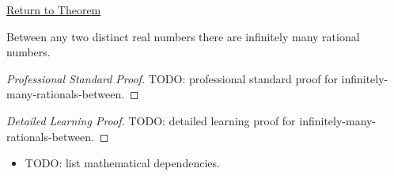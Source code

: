 \newpage
{}
\label{prf:infinitely-many-rationals-between}

\begin{remark*}[Return]
\hyperref[cor:infinitely-many-rationals-between]{Return to Theorem}
\end{remark*}

\begin{corollary*}
Between any two distinct real numbers there are infinitely many rational numbers.
\end{corollary*}

\begin{proof}[Professional Standard Proof]
\LRAProofBodyStart
TODO: professional standard proof for infinitely-many-rationals-between.
\end{proof}

\begin{proof}[Detailed Learning Proof]
\LRAProofBodyStart
TODO: detailed learning proof for infinitely-many-rationals-between.
\end{proof}

\begin{remark*}
\end{remark*}

\begin{dependencies}
\begin{itemize}
  \item TODO: list mathematical dependencies.
\end{itemize}
\end{dependencies}

\clearpage
